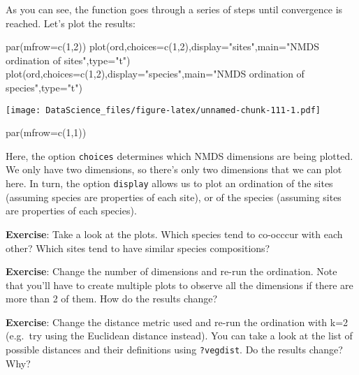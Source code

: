\documentclass[
]{book}
\newenvironment{Shaded}{\begin{snugshade}}{\end{snugshade}}
\newcommand{\AttributeTok}[1]{\textcolor[rgb]{0.77,0.63,0.00}{#1}}
\newcommand{\DecValTok}[1]{\textcolor[rgb]{0.00,0.00,0.81}{#1}}
\newcommand{\FunctionTok}[1]{\textcolor[rgb]{0.00,0.00,0.00}{#1}}
\newcommand{\NormalTok}[1]{#1}
\newcommand{\StringTok}[1]{\textcolor[rgb]{0.31,0.60,0.02}{#1}}
\begin{document}
As you can see, the function goes through a series of steps until convergence is reached. Let's plot the results:

\begin{Shaded}
\begin{Highlighting}[]
\FunctionTok{par}\NormalTok{(}\AttributeTok{mfrow=}\FunctionTok{c}\NormalTok{(}\DecValTok{1}\NormalTok{,}\DecValTok{2}\NormalTok{))}
\FunctionTok{plot}\NormalTok{(ord,}\AttributeTok{choices=}\FunctionTok{c}\NormalTok{(}\DecValTok{1}\NormalTok{,}\DecValTok{2}\NormalTok{),}\AttributeTok{display=}\StringTok{"sites"}\NormalTok{,}\AttributeTok{main=}\StringTok{"NMDS ordination of sites"}\NormalTok{,}\AttributeTok{type=}\StringTok{"t"}\NormalTok{)}
\FunctionTok{plot}\NormalTok{(ord,}\AttributeTok{choices=}\FunctionTok{c}\NormalTok{(}\DecValTok{1}\NormalTok{,}\DecValTok{2}\NormalTok{),}\AttributeTok{display=}\StringTok{"species"}\NormalTok{,}\AttributeTok{main=}\StringTok{"NMDS ordination of species"}\NormalTok{,}\AttributeTok{type=}\StringTok{"t"}\NormalTok{)}
\end{Highlighting}
\end{Shaded}

\texttt{[image: DataScience\_files/figure-latex/unnamed-chunk-111-1.pdf]}

\begin{Shaded}
\begin{Highlighting}[]
\FunctionTok{par}\NormalTok{(}\AttributeTok{mfrow=}\FunctionTok{c}\NormalTok{(}\DecValTok{1}\NormalTok{,}\DecValTok{1}\NormalTok{))}
\end{Highlighting}
\end{Shaded}

Here, the option \texttt{choices} determines which NMDS dimensions are being plotted. We only have two dimensions, so there's only two dimensions that we can plot here. In turn, the option \texttt{display} allows us to plot an ordination of the sites (assuming species are properties of each site), or of the species (assuming sites are properties of each species).

\textbf{Exercise}: Take a look at the plots. Which species tend to co-occcur with each other? Which sites tend to have similar species compositions?

\textbf{Exercise}: Change the number of dimensions and re-run the ordination. Note that you'll have to create multiple plots to observe all the dimensions if there are more than 2 of them. How do the results change?

\textbf{Exercise}: Change the distance metric used and re-run the ordination with k=2 (e.g.~try using the Euclidean distance instead). You can take a look at the list of possible distances and their definitions using \texttt{?vegdist}. Do the results change? Why?
\end{document}
